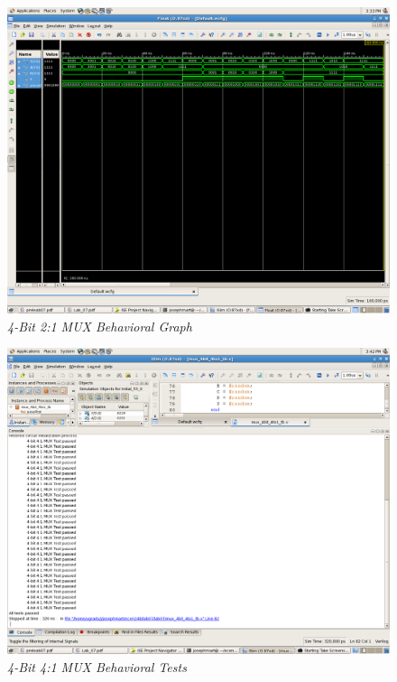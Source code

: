 \documentclass[a4paper,12pt]{article}
\begin{document}
  \newpage

  \begin{figure}[h]
    \begin{center}
      \includegraphics[scale=0.18]{1_2_2.png}
      \caption{\textit{4-Bit 2:1 MUX Behavioral Graph}}
    \end{center}
  \end{figure}

  \begin{figure}[h]
    \begin{center}
      \includegraphics[scale=0.18]{1_3_1.png}
      \caption{\textit{4-Bit 4:1 MUX Behavioral Tests}}
    \end{center}
  \end{figure}
\end{document}
